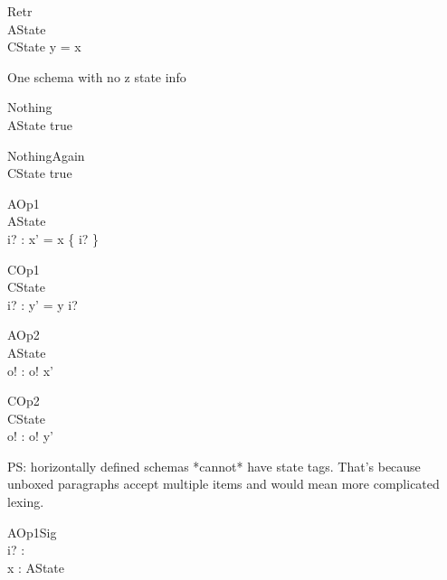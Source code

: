 \begin{schema}{Retr}
\\
 AState \\
 CState 
\where
 \ran y = x
\end{schema}



One schema with no z state info
\begin{schema}{Nothing}
\\
 \Delta AState 
\where
 true
\end{schema}



\begin{schema}{NothingAgain}
\\
 \Delta CState 
\where
 true
\end{schema}



\begin{schema}{AOp1}
\\
 \Delta AState \\
 i? : \nat 
\where
 x' = x \cup \{ i? \}
\end{schema}



\begin{schema}{COp1}
\\
 \Delta CState \\
 i? : \nat 
\where
 y' = y \cat \langle i? \rangle
\end{schema}



\begin{schema}{AOp2}
\\
 \Xi AState \\
 o! : \nat 
\where
 o! \in x'
\end{schema}



\begin{schema}{COp2}
\\
 \Xi CState \\
 o! : \nat 
\where
 o! \in \ran y'
\end{schema}



PS: horizontally defined schemas *cannot* have state tags. That's because
unboxed paragraphs accept multiple items and would mean more complicated lexing.

\begin{schema}{AOp1Sig}
\\
 i? : \nat \\
 x : \power \nat 
\where
 AState
\end{schema}



